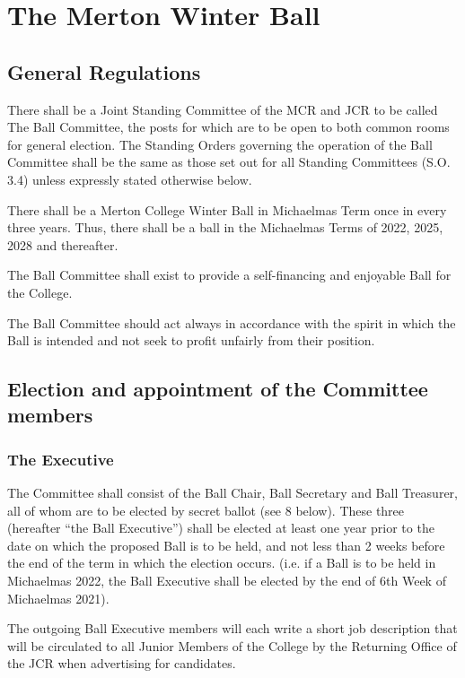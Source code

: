 \chapter{The Merton Winter Ball}
\section{General Regulations}
\appnpara There shall be a Joint Standing Committee of the MCR and JCR to be called The Ball Committee, the posts for which are to be open to both common rooms for general election.  The Standing Orders governing the operation of the Ball Committee shall be the same as those set out for all Standing Committees (S.O. 3.4) unless expressly stated otherwise below.

\appnpara There shall be a Merton College Winter Ball in Michaelmas Term once in every three years.  Thus, there shall be a ball in the Michaelmas Terms of 2022, 2025, 2028 and thereafter.

\appnpara The Ball Committee shall exist to provide a self-financing and enjoyable Ball for the College.  

\appnpara The Ball Committee should act always in accordance with the spirit in which the Ball is intended and not seek to profit unfairly from their position.

\section{Election and appointment of the Committee members}

\subsection{The Executive}
 
\appnpara The Committee shall consist of the Ball Chair, Ball Secretary and Ball Treasurer, all of whom are to be elected by secret ballot (see 8 below). These three (hereafter “the Ball Executive”) shall be elected at least one year prior to the date on which the proposed Ball is to be held, and not less than 2 weeks before the end of the term in which the election occurs.  (i.e. if a Ball is to be held in Michaelmas 2022, the Ball Executive shall be elected by the end of 6th Week of Michaelmas 2021). 

\appnpara The outgoing Ball Executive members will each write a short job description that will be circulated to all Junior Members of the College by the Returning Office of the JCR when advertising for candidates.

